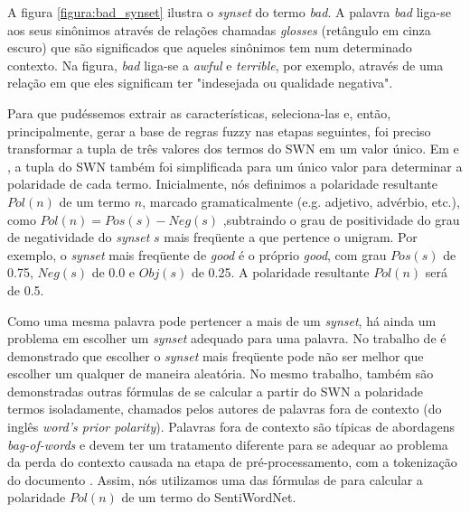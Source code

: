  
A figura \ref{figura:bad_synset} ilustra o \textit{synset} do termo \textit{bad}. A palavra \textit{bad} liga-se aos seus sinônimos através de relações chamadas \textit{glosses} (retângulo em cinza escuro) que são significados que aqueles sinônimos tem num determinado contexto. Na figura, \textit{bad} liga-se a \textit{awful} e \textit{terrible}, por exemplo, através de uma relação em que eles significam ter "indesejada ou qualidade negativa".
 
Para que pudéssemos extrair as características, seleciona-las e, então, principalmente, gerar a base de regras fuzzy nas etapas seguintes, foi preciso transformar a tupla de três valores dos termos do SWN em um valor único. Em \cite{ohana2009sentiment} e \cite{khan2011sentiment}, a tupla do SWN também foi simplificada para um único valor para determinar a polaridade de cada termo. Inicialmente, nós definimos a polaridade resultante $Pol(n)$ de um termo  $n$, marcado gramaticalmente (e.g. adjetivo, advérbio, etc.), como $Pol(n) = Pos(s) - Neg(s)$ ,subtraindo o grau de positividade do grau de negatividade do \textit{synset} $s$ mais freqüente a que pertence o unigram. Por exemplo, o \textit{synset} mais freqüente de \textit{good} é o próprio \textit{good}, com grau $Pos(s)$ de 0.75, $Neg(s)$ de 0.0 e $Obj(s)$ de 0.25. A polaridade resultante $Pol(n)$ será de 0.5.

Como uma mesma palavra pode pertencer a mais de um \textit{synset}, há ainda um problema em escolher um \textit{synset} adequado para uma palavra. No trabalho de \cite{guerini2013sentiment} é demonstrado que escolher o \textit{synset} mais freqüente pode não ser melhor que escolher um qualquer de maneira aleatória. No mesmo trabalho, também são demonstradas outras fórmulas de se calcular a partir do SWN a polaridade termos isoladamente, chamados pelos autores de palavras fora de contexto (do inglês \textit{word’s prior polarity}). Palavras fora de contexto são típicas de abordagens \textit{bag-of-words} e devem ter um tratamento diferente para se adequar ao problema da perda do contexto causada na etapa de pré-processamento, com a tokenização do documento \cite{guerini2013sentiment}. Assim, nós utilizamos uma das fórmulas de \cite{guerini2013sentiment} para calcular a polaridade $Pol(n)$ de um termo do SentiWordNet. 


